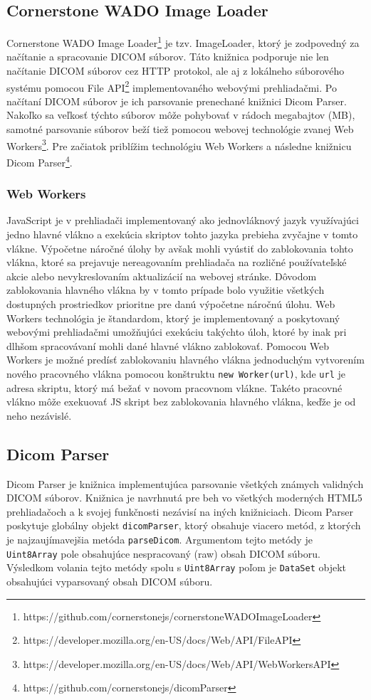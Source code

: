 \subsection {Cornerstone WADO Image Loader}
Cornerstone WADO Image Loader\footnote{https://github.com/cornerstonejs/cornerstoneWADOImageLoader} je tzv. ImageLoader, ktorý je zodpovedný za načítanie a spracovanie DICOM súborov. Táto knižnica podporuje nie len načítanie DICOM súborov cez HTTP protokol, ale aj z lokálneho súborového systému pomocou File API\footnote{https://developer.mozilla.org/en-US/docs/Web/API/File\textunderscore API} implementovaného webovými prehliadačmi. Po načítaní DICOM súborov je ich parsovanie prenechané knižnici Dicom Parser. Nakoľko sa veľkosť týchto súborov môže pohybovať v rádoch megabajtov (MB), samotné parsovanie súborov beží tiež pomocou webovej technológie zvanej Web Workers\footnote{https://developer.mozilla.org/en-US/docs/Web/API/Web\textunderscore Workers\textunderscore API}. Pre začiatok priblížim technológiu Web Workers a následne knižnicu Dicom Parser\footnote{https://github.com/cornerstonejs/dicomParser}.

\subsubsection {Web Workers}
JavaScript je v prehliadači implementovaný ako jednovláknový jazyk využívajúci jedno hlavné vlákno a exekúcia skriptov tohto jazyka prebieha zvyčajne v tomto vlákne. Výpočetne náročné úlohy by avšak mohli vyústiť do zablokovania tohto vlákna, ktoré sa prejavuje nereagovaním prehliadača na rozličné používateľské akcie alebo nevykreslovaním aktualizácií na webovej stránke. Dôvodom zablokovania hlavného vlákna by v tomto prípade bolo využitie všetkých dostupných prostriedkov prioritne pre danú výpočetne náročnú úlohu. \newline
Web Workers technológia je štandardom, ktorý je implementovaný a poskytovaný webovými prehliadačmi umožňujúci exekúciu takýchto úloh, ktoré by inak pri dlhšom spracovávaní mohli dané hlavné vlákno zablokovať. Pomocou Web Workers je možné predísť zablokovaniu hlavného vlákna jednoduchým vytvorením nového pracovného vlákna pomocou konštruktu \texttt{new Worker(url)}, kde \texttt{url} je adresa skriptu, ktorý má bežať v novom pracovnom vlákne. Takéto pracovné vlákno môže exekuovať JS skript bez zablokovania hlavného vlákna, keďže je od neho nezávislé. 

\subsection {Dicom Parser}
Dicom Parser je knižnica implementujúca parsovanie všetkých známych validných DICOM súborov. Knižnica je navrhnutá pre beh vo všetkých moderných HTML5 prehliadačoch a k svojej funkčnosti nezávisí na iných knižniciach. Dicom Parser poskytuje globálny objekt \texttt{dicomParser}, ktorý obsahuje viacero metód, z ktorých je najzaujímavejšia metóda \texttt{parseDicom}. Argumentom tejto metódy je \texttt{Uint8Array} pole obsahujúce nespracovaný (raw) obsah DICOM súboru. Výsledkom volania tejto metódy spolu s \texttt{Uint8Array} poľom je \texttt{DataSet} objekt obsahujúci vyparsovaný obsah DICOM súboru.

